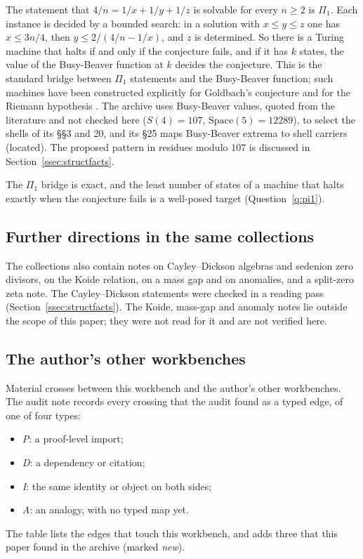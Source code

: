 The statement that $4/n=1/x+1/y+1/z$ is solvable for every $n\ge2$ is $\Pi_1$. Each instance is decided by a bounded search: in a solution with $x\le y\le z$ one has $x\le3n/4$, then $y\le2/(4/n-1/x)$, and $z$ is determined. So there is a Turing machine that halts if and only if the conjecture fails, and if it has $k$ states, the value of the Busy-Beaver function at $k$ decides the conjecture. This is the standard bridge between $\Pi_1$ statements and the Busy-Beaver function; such machines have been constructed explicitly for Goldbach's conjecture and for the Riemann hypothesis \cite{Aaronson}. The archive uses Busy-Beaver values, quoted from the literature and not checked here ($S(4)=107$, $\mathrm{Space}(5)=12289$), to select the shells of its §§3 and 20, and its §25 maps Busy-Beaver extrema to shell carriers (located). The proposed pattern in residues modulo $107$ is discussed in Section~\ref{ssec:structfacts}.

The $\Pi_1$ bridge is exact, and the least number of states of a machine that halts exactly when the conjecture fails is a well-posed target (Question~\ref{q:pi1}).

\subsection{Further directions in the same collections}

The collections also contain notes on Cayley--Dickson algebras and sedenion zero divisors, on the Koide relation, on a mass gap and on anomalies, and a split-zero zeta note. The Cayley--Dickson statements were checked in a reading pass (Section~\ref{ssec:structfacts}). The Koide, mass-gap and anomaly notes lie outside the scope of this paper; they were not read for it and are not verified here.

\subsection{The author's other workbenches}\label{ssec:wbedges}

Material crosses between this workbench and the author's other workbenches. The audit note  records every crossing that the audit found as a typed edge, of one of four types:
\begin{itemize}
\item \emph{P}: a proof-level import;
\item \emph{D}: a dependency or citation;
\item \emph{I}: the same identity or object on both sides;
\item \emph{A}: an analogy, with no typed map yet.
\end{itemize}
The table lists the edges that touch this workbench, and adds three that this paper found in the archive (marked \emph{new}).

